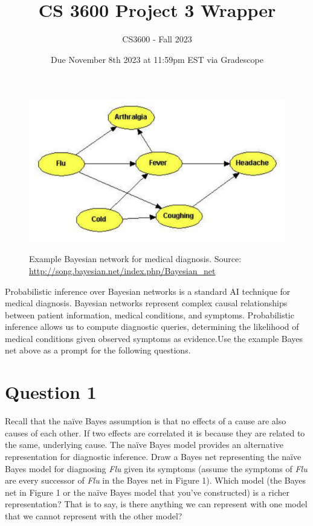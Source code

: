 \documentclass[12pt]{article}
\title{CS 3600 Project 3 Wrapper}
\author{CS3600 - Fall 2023}
\date{Due November 8th 2023 at 11:59pm EST via Gradescope}
\begin{document}
\maketitle

\begin{figure}[htp]
    \includegraphics[width=14cm]{img/P3Q1Network.png}
    \label{fig:network}
    \caption{ Example Bayesian network for medical diagnosis. \newline Source: \url{http://song.bayesian.net/index.php/Bayesian_net}}
\end{figure}

Probabilistic inference over Bayesian networks is a standard AI technique for 
medical diagnosis. Bayesian networks represent complex causal relationships between
patient information, medical conditions, and symptoms. Probabilistic inference 
allows us to compute diagnostic queries, determining the likelihood of medical 
conditions given observed symptoms as evidence.Use the example Bayes net above as a
prompt for the following questions.
\newpage

\section*{Question 1} Recall that the naïve Bayes assumption is that no effects of a
cause are also causes of each other. If two effects are correlated it is because 
they are related to the same, underlying cause. The naïve Bayes model provides an 
alternative representation for diagnostic inference. Draw a Bayes net representing 
the naïve Bayes model for diagnosing \textit{Flu} given its symptoms (assume the 
symptoms of \textit{Flu} are every successor of \textit{Flu} in the Bayes net in 
Figure 1). Which model (the Bayes net in Figure 1 or the naïve Bayes model that 
you've constructed) is a richer representation? That is to say, is there anything 
we can represent with one model that we cannot represent with the other model? \\
\end{document}
